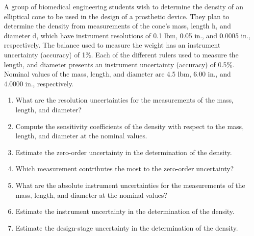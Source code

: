 \documentclass[a4paper,11pt,dvipsnames]{book}
\begin{document}
\begin{question}


A group of biomedical engineering students wish to
determine the density of an elliptical cone to be used in the
design of a prosthetic device. They plan to determine the
density from measurements of the cone's mass, length h,
and diameter d, which have instrument resolutions of 0.1
lbm, 0.05 in., and 0.0005 in., respectively. The balance used
to measure the weight has an instrument uncertainty
(accuracy) of 1\%. Each of the different rulers used to
measure the length, and diameter presents an instrument uncertainty (accuracy) of 0.5\%. Nominal
values of the mass, length, and diameter are 4.5 lbm, 6.00 in., and 4.0000 in., respectively.

\begin{enumerate}
\item What are the resolution uncertainties for the measurements of the mass, length, and diameter?
\item Compute the sensitivity coefficients of the density with respect to the mass, length, and diameter at
the nominal values.
\item Estimate the zero-order uncertainty in the determination of the density.
\item Which measurement contributes the most to the zero-order uncertainty?
\item What are the absolute instrument uncertainties for the measurements of the mass, length, and
diameter at the nominal values?
\item Estimate the instrument uncertainty in the determination of the density.
\item Estimate the design-stage uncertainty in the determination of the density.
\end{enumerate}
\end{question}
\begin{solution}
\examspace*{10em}

\end{solution}
\end{document}

